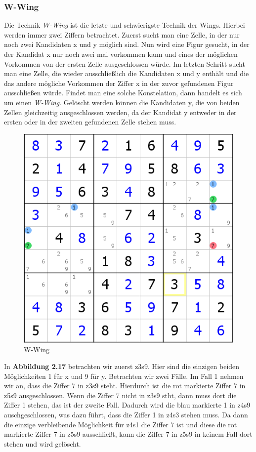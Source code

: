 \newpage
\subsubsection{W-Wing}
Die Technik \textit{W-Wing} ist die letzte und schwierigste Technik der Wings. Hierbei werden immer zwei Ziffern betrachtet. Zuerst sucht man eine Zelle, in der nur noch zwei Kandidaten x und y möglich sind. Nun wird eine Figur gesucht, in der der Kandidat x nur noch zwei mal vorkommen kann und eines der möglichen Vorkommen von der ersten Zelle ausgeschlossen würde. Im letzten Schritt sucht man eine Zelle, die wieder ausschließlich die Kandidaten x und y enthält und die das andere mögliche Vorkommen der Ziffer x in der zuvor gefundenen Figur ausschließen würde. Findet man eine solche Konstelation, dann handelt es sich um einen \textit{W-Wing}. Gelöscht werden können die  Kandidaten y, die von beiden Zellen gleichzeitig ausgeschlossen werden, da der Kandidat y entweder in der ersten oder in der zweiten gefundenen Zelle stehen muss.

\begin{figure}[h]
\begin{center}
\includegraphics{./img/W_Wing.png}
\caption{W-Wing}
\end{center}
\end{figure}

\noindent In \textbf{Abbildung 2.17} betrachten wir zuerst z3s9. Hier sind die einzigen beiden Möglichkeiten 1 für x und 9 für y. Betrachten wir zwei Fälle. Im Fall 1 nehmen wir an, dass die Ziffer 7 in z3s9 steht. Hierdurch ist die rot markierte Ziffer 7 in z5s9 ausgeschlossen. Wenn die Ziffer 7 nicht in z3s9 stht, dann muss dort die Ziffer 1 stehen, das ist der zweite Fall. Dadurch wird die blau markierte 1 in z4s9 auschgeschlossen, was dazu führt, dass die Ziffer 1 in z4s3 stehen muss. Da dann die einzige verbleibende Möglichkeit für z4s1 die Ziffer 7 ist und diese die rot markierte Ziffer 7 in z5s9 ausschließt, kann die Ziffer 7 in z5s9 in keinem Fall dort stehen und wird gelöscht.